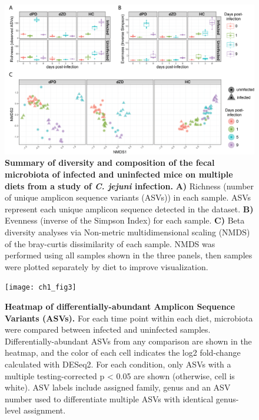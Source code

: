 \documentclass[11pt,twocolumn,notitlepage,openany,twoside]{book}
\begin{document}
\begin{refsection}
\begin{figure}[tb]
\centering
\includegraphics[width=\textwidth]{ch1_fig2}
\caption[Summary of diversity and composition of the fecal microbiota of infected and uninfected mice on multiple diets from a study of \textit{C. jejuni} infection.]{\textbf{Summary of diversity and composition of the fecal microbiota of infected and uninfected mice on multiple diets from a study of \textit{C. jejuni} infection.} \textbf{A)} Richness (number of unique amplicon sequence variants (ASVs)) in each sample. ASVs represent each unique amplicon sequence detected in the dataset. \textbf{B)} Evenness (inverse of the Simpson Index) for each sample. \textbf{C)} Beta diversity analyses via Non-metric multidimensional scaling (NMDS) of the bray-curtis dissimilarity of each sample. NMDS was performed using all samples shown in the three panels, then samples were plotted separately by diet to improve visualization.}
\end{figure}

\begin{figure}[tb]
\centering
\texttt{[image: ch1\_fig3]}
\caption[Heatmap of differentially-abundant Amplicon Sequence Variants (ASVs).]{\textbf{Heatmap of differentially-abundant Amplicon Sequence Variants (ASVs).} For each time point within each diet, microbiota were compared between infected and uninfected samples. Differentially-abundant ASVs from any comparison are shown in the heatmap, and the color of each cell indicates the log2 fold-change calculated with DESeq2. For each condition, only ASVs with a multiple testing-corrected p < 0.05 are shown (otherwise, cell is white). ASV labels include assigned family, genus and an ASV number used to differentiate multiple ASVs with identical genus-level assignment.}
\end{figure}



\end{refsection}
\end{document}
